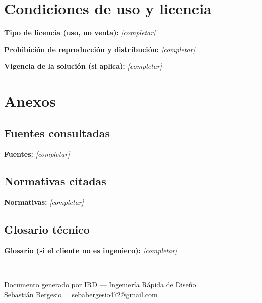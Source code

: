 \documentclass[11pt,a4paper]{article}
\newcommand{\campoVacio}[1]{\textbf{\textcolor{irdblack}{#1:}} \textcolor{irdblack}{\textit{[completar]}}\par\vspace{0.3em}}
\begin{document}
\section{Condiciones de uso y licencia}

\campoVacio{Tipo de licencia (uso, no venta)}
\campoVacio{Prohibición de reproducción y distribución}
\campoVacio{Vigencia de la solución (si aplica)}

\section{Anexos}

\subsection{Fuentes consultadas}
\campoVacio{Fuentes}

\subsection{Normativas citadas}
\campoVacio{Normativas}

\subsection{Glosario técnico}
\campoVacio{Glosario (si el cliente no es ingeniero)}

\vfill

\begin{center}
{\color{irdorange}\rule{0.5\textwidth}{1pt}}\\[0.3cm]
{\small\color{irdblack} Documento generado por IRD --- Ingeniería Rápida de Diseño}\\
{\small\color{irdblack} Sebastián Bergesio · sebabergesio472@gmail.com}
\end{center}
\end{document}
